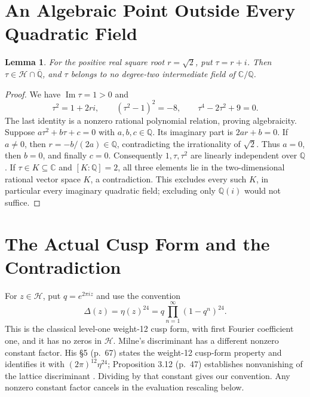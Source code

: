 \documentclass[11pt]{article}
\newtheorem{lemma}{Lemma}
\newcommand{\Q}{\mathbb Q}
\newcommand{\C}{\mathbb C}
\newcommand{\Hh}{\mathcal H}
\begin{document}
\section{An Algebraic Point Outside Every Quadratic Field}
\begin{lemma}
For the positive real square root $r=\sqrt2$, put $\tau=r+i$.
Then $\tau\in\Hh\cap\overline{\Q}$, and $\tau$ belongs to no
 degree-two intermediate field of $\C/\Q$.
\end{lemma}
\begin{proof}
We have $\operatorname{Im}\tau=1>0$ and
\[
 \tau^2=1+2ri,\qquad (\tau^2-1)^2=-8,
 \qquad \tau^4-2\tau^2+9=0.
\]
The last identity is a nonzero rational polynomial relation, proving
algebraicity. Suppose $a\tau^2+b\tau+c=0$ with $a,b,c\in\Q$.
Its imaginary part is $2ar+b=0$. If $a\ne0$, then
$r=-b/(2a)\in\Q$, contradicting the irrationality of $\sqrt2$.
Thus $a=0$, then $b=0$, and finally $c=0$. Consequently
$1,\tau,\tau^2$ are linearly independent over $\Q$.
If $\tau\in K\subseteq\C$ and $[K:\Q]=2$, all three elements lie in
 the two-dimensional rational vector space $K$, a contradiction.
This excludes every such $K$, in particular every imaginary quadratic
field; excluding only $\Q(i)$ would not suffice.
\end{proof}
\newpage
\section{The Actual Cusp Form and the Contradiction}
For $z\in\Hh$, put $q=e^{2\pi iz}$ and use the convention
\[
 \Delta(z)=\eta(z)^{24}=q\prod_{n=1}^{\infty}(1-q^n)^{24}.
\]
This is the classical level-one weight-12 cusp form, with first Fourier
coefficient one, and it has no zeros in $\Hh$.
Milne's discriminant has a different nonzero constant factor.
His \S5 (p.~67) states the weight-12 cusp-form property and identifies
it with $(2\pi)^{12}\eta^{24}$; Proposition 3.12 (p.~47) establishes
nonvanishing of the lattice discriminant \cite{Milne}.
Dividing by that constant gives our convention. Any nonzero constant
factor cancels in the evaluation rescaling below.
\end{document}
